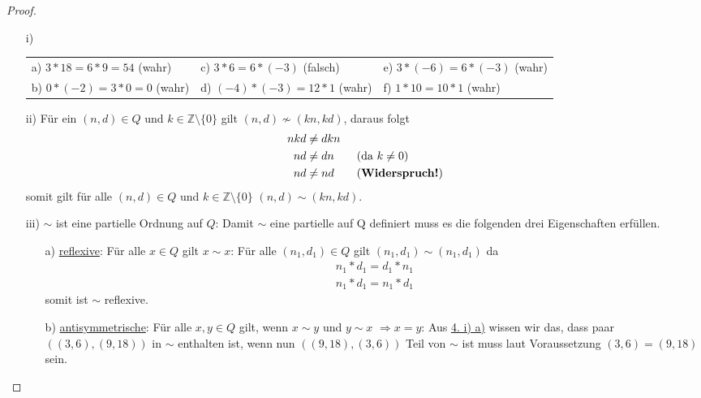 \documentclass{exam}
\begin{document}
\begin{proof} \ \newline
    \begin{enumerate}
        \item [i)]
              \renewcommand{\arraystretch}{1.5}
              \begin{tabularx}{\textwidth}{ X X X }
                  a) $3*18 = 6*9 = 54$ (wahr)  & c) $3*6 = 6*(-3)$ (falsch)  & e) $3*(-6) = 6 * (-3)$ (wahr) \\
                  b) $0*(-2) = 3*0 = 0$ (wahr) & d) $(-4)*(-3)= 12*1$ (wahr) & f) $1*10 = 10*1$ (wahr)
              \end{tabularx}
        \item [ii)] Für ein $(n,d) \in Q$ und $k \in \mathbb{Z}\setminus\{0\}$ gilt $(n,d) \not\sim (kn,kd)$, daraus folgt
              \begin{align}
                  nkd & \neq dkn                            \\
                  nd  & \neq dn \tag{da $k \neq 0$}         \\
                  nd  & \neq nd \tag{\textbf{Widerspruch!}}
              \end{align}
              somit gilt für alle $(n,d) \in Q$ und $k \in \mathbb{Z}\setminus\{0\}$ $(n,d) \sim (kn,kd)$.
        \item [iii)] $\sim$ ist eine partielle Ordnung auf $Q$: \newline
              Damit $\sim$ eine partielle auf Q definiert muss es die folgenden drei Eigenschaften erfüllen.
              \begin{enumerate}
                  \item [a)] \underline{reflexive}: Für alle $x \in Q$ gilt $x \sim x$: \newline
                        Für alle $(n_1,d_1) \in Q$ gilt $(n_1, d_1) \sim (n_1, d_1)$ da \begin{align}
                            n_1*d_1 = d_1*n_1 \\
                            n_1*d_1 = n_1*d_1
                        \end{align} somit ist $\sim$ reflexive. \checkmark
                  \item [b)] \underline{antisymmetrische}: Für alle $x, y \in Q$ gilt, wenn $x \sim y$ und $y \sim x$ $\Rightarrow x = y$: \newline
                        Aus \underline{4. i) a)} wissen wir das, dass paar $((3,6),(9,18))$ in $\sim$ enthalten ist, wenn nun $((9,18),(3,6))$ Teil von $\sim$ ist muss laut Voraussetzung $(3,6) = (9,18)$ sein.

\end{enumerate}
\end{enumerate}
\end{proof}
\end{document}
